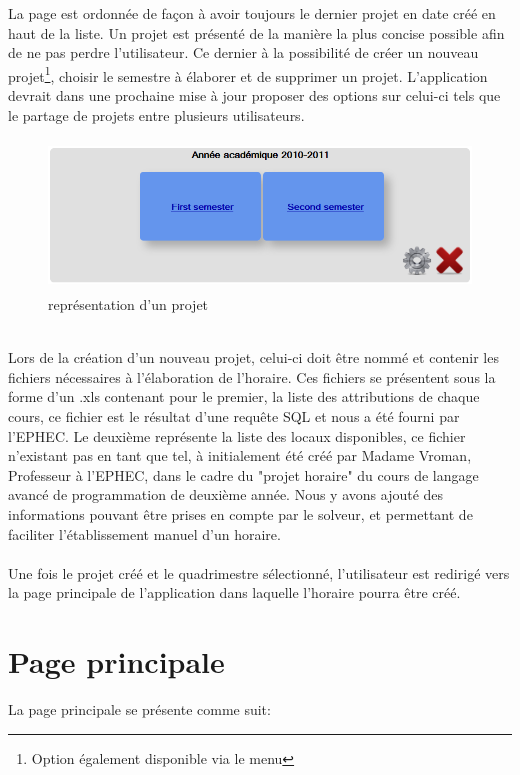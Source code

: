 La page est ordonnée de façon à avoir toujours le dernier projet en date créé en haut de la liste. Un projet est présenté de la manière la plus concise possible afin de ne pas perdre l'utilisateur. Ce dernier à la possibilité de créer un nouveau projet\footnote{Option également disponible via le menu}, choisir le semestre à élaborer et de supprimer un projet. L'application devrait dans une prochaine mise à jour proposer des options sur celui-ci tels que le partage de projets entre plusieurs utilisateurs.\\
\begin{figure}[!h]
	\begin{center}
	\includegraphics[width=12cm,height=4cm]{project.png}	
	\caption{représentation d'un projet}
\end{center}
\end{figure}
\\Lors de la création d'un nouveau projet, celui-ci doit être nommé et contenir les fichiers nécessaires à l'élaboration de l'horaire. Ces fichiers se présentent sous la forme d'un .xls contenant pour le premier, la liste des attributions de chaque cours, ce fichier est le résultat d'une requête SQL et nous a été fourni par l'EPHEC. Le deuxième représente la liste des locaux disponibles, ce fichier n'existant pas en tant que tel, à initialement été créé par Madame Vroman, Professeur à l'EPHEC, dans le cadre du "projet horaire" du cours de langage avancé de programmation de deuxième année. Nous y avons ajouté des informations pouvant être prises en compte par le solveur, et permettant de faciliter l'établissement manuel d'un horaire.\\
\\
Une fois le projet créé et le quadrimestre sélectionné, l'utilisateur est redirigé vers la page principale de l'application dans laquelle l'horaire pourra être créé.

\section{Page principale}
La page principale se présente comme suit:\\

